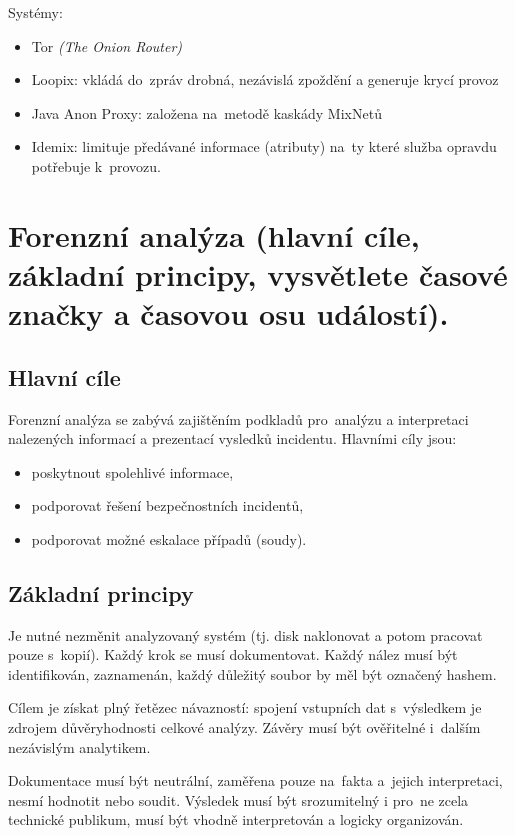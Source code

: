 Systémy:
\vspace*{-0.5em}\begin{itemize}
    \item Tor \emph{(The Onion Router)}
    \item Loopix: vkládá do~zpráv drobná, nezávislá zpoždění a generuje krycí provoz
    \item Java Anon Proxy: založena na~metodě kaskády MixNetů
    \item Idemix: limituje předávané informace (atributy) na~ty které služba opravdu potřebuje k~provozu.
\end{itemize}

\clearpage
\section{Forenzní analýza (hlavní cíle, základní principy, vysvětlete časové značky a časovou osu událostí).}
\subsection{Hlavní cíle}

Forenzní analýza se zabývá zajištěním podkladů pro~analýzu a interpretaci nalezených informací a prezentací vysledků incidentu.
Hlavními cíly jsou:
\vspace*{-0.5em}\begin{itemize}
    \item poskytnout spolehlivé informace,
    \item podporovat řešení bezpečnostních incidentů,
    \item podporovat možné eskalace případů (soudy).
\end{itemize}

\subsection{Základní principy}

Je nutné nezměnit analyzovaný systém (tj. disk naklonovat a potom pracovat pouze s~kopií).
Každý krok se musí dokumentovat.
Každý nález musí být identifikován, zaznamenán, každý důležitý soubor by měl být označený hashem.

Cílem je získat plný řetězec návazností: spojení vstupních dat s~výsledkem je zdrojem důvěryhodnosti celkové analýzy.
Závěry musí být ověřitelné i~dalším nezávislým analytikem.

Dokumentace musí být neutrální, zaměřena pouze na~fakta a~jejich interpretaci, nesmí hodnotit nebo soudit.
Výsledek musí být srozumitelný i pro~ne zcela technické publikum, musí být vhodně interpretován a logicky organizován.

